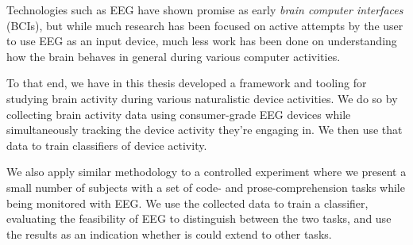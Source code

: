 
Technologies such as EEG have shown promise as early \emph{brain computer interfaces} (BCIs), but while much research has been focused on active attempts by the user to use EEG as an input device, much less work has been done on understanding how the brain behaves in general during various computer activities.



To that end, we have in this thesis developed a framework and tooling for studying brain activity during various naturalistic device activities. We do so by collecting brain activity data using consumer-grade EEG devices while simultaneously tracking the device activity they're engaging in. We then use that data to train classifiers of device activity.

We also apply similar methodology to a controlled experiment where we present a small number of subjects with a set of code- and prose-comprehension tasks while being monitored with EEG\@. We use the collected data to train a classifier, evaluating the feasibility of EEG to distinguish between the two tasks, and use the results as an indication whether is could extend to other tasks.
